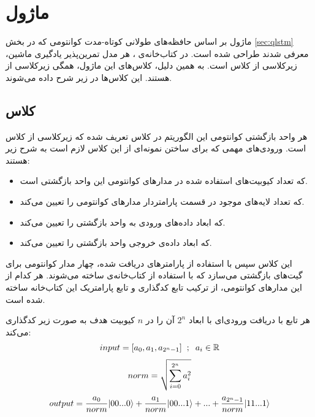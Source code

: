 
\section{ماژول
} \label{sec:qlstm_module}
ماژول
بر اساس حافظه‌های طولانی کوتاه-مدت کوانتومی که در بخش
\ref{sec:qlstm}
معرفی شدند طراحی شده است.
در کتاب‌خانه‌ی 
،
هر مدل تمرین‌پذیر یادگیری ماشین، زیرکلاسی از کلاس
است. به همین دلیل، کلاس‌های این ماژول، همگی زیرکلاسی از
هستند. این کلاس‌ها در زیر شرح داده می‌شوند.

\subsection{
کلاس
}
هر واحد بازگشتی کوانتومی این الگوریتم در کلاس
تعریف شده که زیرکلاسی از کلاس  \\
است.
ورودی‌های مهمی که برای ساختن نمونه‌ای از این کلاس لازم است به شرح زیر هستند:
\begin{itemize}
    \item 
    که تعداد کیوبیت‌های استفاده شده در مدارهای کوانتومی این واحد بازگشتی است.
    \item
    که تعداد لایه‌های موجود در قسمت پارامتردار مدارهای کوانتومی را تعیین می‌کند.
    \item
    که ابعاد داده‌های ورودی به واحد بازگشتی را تعیین می‌کند.
    \item
    که ابعاد داده‌ی خروجی واحد بازگشتی را تعیین می‌کند.
\end{itemize}

این کلاس سپس با استفاده از پارامترهای دریافت شده، چهار مدار کوانتومی برای گیت‌های بازگشتی می‌سازد که با استفاده از کتاب‌خانه‌ی
ساخته می‌شوند.
هر کدام از این مدارهای کوانتومی، از ترکیب تابع کدگذاری
و تابع پارامتریک
این کتاب‌خانه ساخته شده است.

هر تابع
با دریافت ورودی‌ای با ابعاد
$2^n$
آن را در 
$n$
کیوبیت هدف به صورت زیر کدگذاری می‌کند:
\begin{equation} \label{eqn:midi_data}
    \begin{gathered}
       input = [a_0, a_1, a_{2^n-1}] \hspace{2mm} ; \hspace{2mm} a_i \in \mathbb{R} \\[3pt]
       norm = \sqrt{\sum^{2^n}_{i=0} a_i^2 } \\[3pt]
       output = \frac{a_0}{norm} |00...0\rangle + \frac{a_1}{norm} |00...1\rangle + ... + \frac{a_{2^n-1}}{norm} |11...1\rangle
    \end{gathered}
\end{equation}

